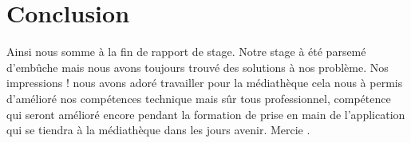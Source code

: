 \documentclass[12pt,a4paper]{article}
\begin{document}
\section{Conclusion}
Ainsi nous somme à la fin de rapport de stage. Notre stage à été parsemé d’embûche mais nous avons
toujours trouvé des solutions à nos problème. Nos impressions ! nous avons adoré travailler pour
la médiathèque cela nous à permis d'amélioré nos compétences technique mais sûr tous professionnel,
compétence qui seront amélioré encore pendant la formation de prise en main de l'application qui se
tiendra à la médiathèque dans les jours avenir. Mercie .
\end{document}
